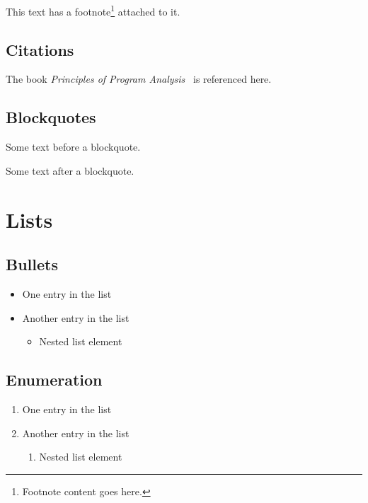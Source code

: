 \documentclass[parskip=half]{scrbook}
\begin{document}
This text has a footnote\footnote{Footnote content goes here.} attached to it.

\subsection{Citations}

The book \emph{Principles of Program Analysis}~\cite{Nielson:ppa} is referenced here.

\subsection{Blockquotes}

Some text before a blockquote.

\begin{quote}
	\lipsum[3]
\end{quote}

Some text after a blockquote.

\section{Lists}

\subsection{Bullets}

\begin{itemize}
	\item One entry in the list
	\item Another entry in the list
	      \begin{itemize}
		      \item Nested list element
	      \end{itemize}
\end{itemize}

\subsection{Enumeration}

\begin{enumerate}
	\item One entry in the list
	\item Another entry in the list
	      \begin{enumerate}
		      \item Nested list element
	      \end{enumerate}
\end{enumerate}
\end{document}
